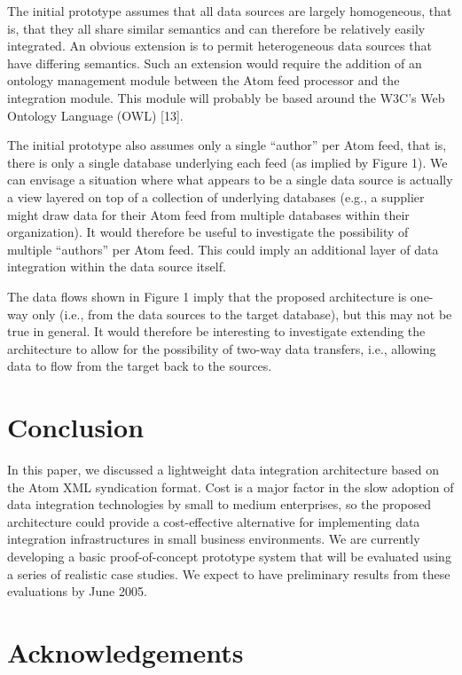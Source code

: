 \documentclass{CRPITStyle}
\begin{document}
The initial prototype assumes that all data sources are largely
homogeneous, that is, that they all share similar semantics and can
therefore be relatively easily integrated. An obvious extension is to
permit heterogeneous data sources that have differing semantics. Such an
extension would require the addition of an ontology management module
between the Atom feed processor and the integration module. This module
will probably be based around the W3C's Web Ontology Language (OWL)
[13].

The initial prototype also assumes only a single ``author'' per Atom feed,
that is, there is only a single database underlying each feed (as
implied by Figure 1). We can envisage a situation where what appears to
be a single data source is actually a view layered on top of a
collection of underlying databases (e.g., a supplier might draw data for
their Atom feed from multiple databases within their organization). It
would therefore be useful to investigate the possibility of multiple
``authors'' per Atom feed. This could imply an additional layer of data
integration within the data source itself.

The data flows shown in Figure 1 imply that the proposed architecture is
one-way only (i.e., from the data sources to the target database), but
this may not be true in general. It would therefore be interesting to
investigate extending the architecture to allow for the possibility of
two-way data transfers, i.e., allowing data to flow from the target back
to the sources.

\section{Conclusion}

In this paper, we discussed a lightweight data integration architecture
based on the Atom XML syndication format. Cost is a major factor in the
slow adoption of data integration technologies by small to medium
enterprises, so the proposed architecture could provide a cost-effective
alternative for implementing data integration infrastructures in small
business environments. We are currently developing a basic
proof-of-concept prototype system that will be evaluated using a series
of realistic case studies. We expect to have preliminary results from
these evaluations by June 2005.

\section{Acknowledgements}
\end{document}
